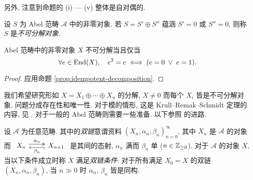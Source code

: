 另外, 注意到命题的 (i) --- (v) 整体是自对偶的.

\begin{definition}\label{def:indecomposable}
	设 $S$ 为 Abel 范畴 $\mathcal{A}$ 中的非零对象. 若 $S = S' \oplus S''$ 蕴涵 $S' = 0$ 或 $S'' = 0$, 则称 $S$ 是\emph{不可分解对象}.
\end{definition}

\begin{corollary}\label{prop:indecomposable-criterion}
	Abel 范畴中的非零对象 $X$ 不可分解当且仅当
	\[ \forall e \in \operatorname{End}(X), \quad e^2 = e \iff (e = 0 \;\vee\; e = 1). \]
\end{corollary}
\begin{proof}
	应用命题 \ref{prop:idempotent-decomposition}.
\end{proof}

我们希望研究形如 $X = X_1 \oplus \cdots \oplus X_n$ 的分解, $X \neq 0$ 而每个 $X_i$ 皆是不可分解对象. 问题分成存在性和唯一性. 对于模的情形, 这是 Krull--Remak--Schmidt 定理的内容, 见 \cite[推论 6.12.9]{Li1}. 对于一般的 Abel 范畴则需要一些准备. 以下参照 \cite{Kr15} 的进路.

\begin{definition}\label{def:bichain}
	设 $\mathcal{A}$ 为任意范畴. 其中的\emph{双链}意谓资料 $(X_n, \alpha_n, \beta_n)_{n=0}^\infty$, 其中 $X_n$ 是 $\mathcal{A}$ 的对象而
	$\begin{tikzcd}
		X_n \arrow[twoheadrightarrow, r, shift left, "\alpha_n"] & X_{n+1} \arrow[hookrightarrow, l, shift left, "\beta_n"]
	\end{tikzcd}$
	是其间的态射, $\alpha_n$ 满而 $\beta_n$ 单 ($n \in \mathbb{Z}_{\geq 0}$). 对于 $\mathcal{A}$ 的对象 $X$, 当以下条件成立时称 $X$ 满足\emph{双链条件}: 对于所有满足 $X_0 = X$ 的双链 $(X_n, \alpha_n, \beta_n)$, 当 $n \gg 0$ 时 $\alpha_n$, $\beta_n$ 皆是同构.
\end{definition}

